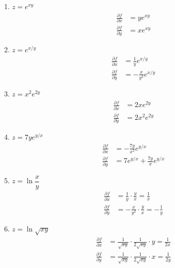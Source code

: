 \begin{enumerate}
    \item $z=e^{x y}$
          \sol{}
          \begin{align*}
              \frac{\partial f}{\partial x} & = y e^{xy} \\ \frac{\partial f}{\partial y} &= x e^{xy}
          \end{align*}

    \item $z=e^{x / y}$
          \sol{}
          \begin{align*}
              \frac{\partial f}{\partial x} & = \frac{1}{y} e^{x/y} \\ \frac{\partial f}{\partial y} &= -\frac{x}{y^2} e^{x/y}
          \end{align*}

    \item $z=x^2 e^{2 y}$
          \sol{}
          \begin{align*}
              \frac{\partial f}{\partial x} & = 2x e^{2y} \\ \frac{\partial f}{\partial y} &= 2x^2 e^{2y}
          \end{align*}

    \item $z=7 y e^{y / x}$
          \sol{}
          \begin{align*}
              \frac{\partial f}{\partial x} & = -\frac{7y}{x^2} e^{y/x} \\ \frac{\partial f}{\partial y} &= 7e^{y/x} + \frac{7y}{x} e^{y/x}
          \end{align*}

    \item $z=\ln \dfrac{x}{y}$
          \sol{}
          \begin{align*}
              \frac{\partial f}{\partial x} & = \frac{1}{y}\cdot\frac{y}{x} = \frac{1}{x} \\ \frac{\partial f}{\partial y} &= -\frac{x}{y^2} \cdot \frac{y}{x} = -\frac{1}{y}
          \end{align*}

          \newpage
    \item $z=\ln \sqrt{x y}$
          \sol{}
          \begin{align*}
              \frac{\partial f}{\partial x} & = \frac{1}{\sqrt{xy}} \cdot \frac{1}{2\sqrt{xy}} \cdot y =
              \frac{1}{2x}                                                                               \\ \frac{\partial f}{\partial y} & = \frac{1}{\sqrt{xy}} \cdot \frac{1}{2\sqrt{xy}} \cdot x =
                 \frac{1}{2y}
          \end{align*}


\end{enumerate}

